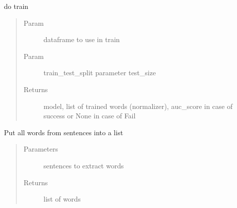 \documentclass[letterpaper,10pt,english]{sphinxmanual}
\begin{document}
\begin{fulllineitems}
\label{\detokenize{algorithms:algorithms.ira.ira_trainer.train}}
\sphinxAtStartPar
do train
\begin{quote}\begin{description}
\item[{Param}] \leavevmode
\sphinxAtStartPar
dataframe to use in train

\item[{Param}] \leavevmode
\sphinxAtStartPar
train\_test\_split parameter test\_size

\item[{Returns}] \leavevmode
\sphinxAtStartPar
model, list of trained words (normalizer), auc\_score in case of success or None in case of Fail

\end{description}\end{quote}

\end{fulllineitems}


\begin{fulllineitems}
\label{\detokenize{algorithms:algorithms.ira.ira_trainer.words_to_list}}
\sphinxAtStartPar
Put all words from sentences into a list
\begin{quote}\begin{description}
\item[{Parameters}] \leavevmode
\sphinxAtStartPar
{} \textendash{} sentences to extract words

\item[{Returns}] \leavevmode
\sphinxAtStartPar
list of words

\end{description}\end{quote}

\end{fulllineitems}


\sphinxAtStartPar
{}
\end{document}
